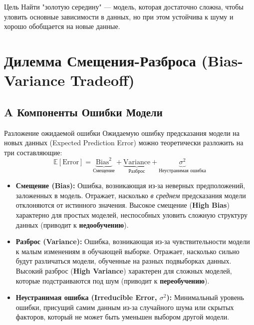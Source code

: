 \begin{textbox}{Цель}
    Найти "золотую середину" — модель, которая достаточно сложна, чтобы уловить основные зависимости в данных, но при этом устойчива к шуму и хорошо обобщается на новые данные.
\end{textbox}

\section{Дилемма Смещения-Разброса (Bias-Variance Tradeoff)}

\subsection{A Компоненты Ошибки Модели}
\begin{textbox}{Разложение ожидаемой ошибки}
    Ожидаемую ошибку предсказания модели на новых данных (Expected Prediction Error) можно теоретически разложить на три составляющие:
    \[ \mathbb{E}[\text{Error}] = \underbrace{\text{Bias}^2}_{\text{Смещение}} + \underbrace{\text{Variance}}_{\text{Разброс}} + \underbrace{\sigma^2}_{\text{Неустранимая ошибка}} \]
    \begin{itemize}[nosep, leftmargin=*]
        \item \textbf{Смещение (Bias):} Ошибка, возникающая из-за неверных предположений, заложенных в модель. Отражает, насколько \textit{в среднем} предсказания модели отклоняются от истинного значения. Высокое смещение (\textbf{High Bias}) характерно для простых моделей, неспособных уловить сложную структуру данных (приводит к \textbf{недообучению}).
        \item \textbf{Разброс (Variance):} Ошибка, возникающая из-за чувствительности модели к малым изменениям в обучающей выборке. Отражает, насколько сильно будут различаться модели, обученные на разных подвыборках данных. Высокий разброс (\textbf{High Variance}) характерен для сложных моделей, которые подстраиваются под шум (приводит к \textbf{переобучению}).
        \item \textbf{Неустранимая ошибка (Irreducible Error, $\sigma^2$):} Минимальный уровень ошибки, присущий самим данным из-за случайного шума или скрытых факторов, который не может быть уменьшен выбором другой модели.
    \end{itemize}
\end{textbox}

